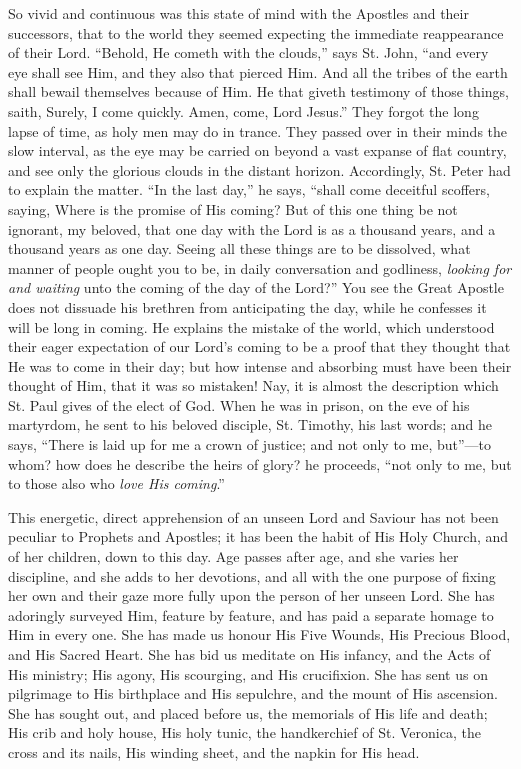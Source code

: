 So vivid and continuous was this state of mind with
the Apostles and their successors, that to the world they
seemed expecting the immediate reappearance of their
Lord. ``Behold, He cometh with the clouds,'' says
St. John, ``and every eye shall see Him, and they
also that pierced Him. And all the tribes of the earth
shall bewail themselves because of Him. He that giveth
testimony of those things, saith, Surely, I come quickly.
Amen, come, Lord Jesus.'' They forgot the long lapse
of time, as holy men may do in trance. They passed over
in their minds the slow interval, as the eye may be
carried on beyond a vast expanse of flat country, and see
only the glorious clouds in the distant horizon.
Accordingly, St. Peter had to explain the matter.
``In the last day,'' he says, ``shall come
deceitful scoffers, saying, Where is the promise of His
coming? But of this one thing be not ignorant, my
beloved, that one day with the Lord is as a thousand
years, and a thousand years as one day. Seeing all these
things are to be dissolved, what manner of people ought
you to be, in daily conversation and godliness, \emph{looking
for and waiting} unto the coming of the day of the
Lord?'' You see the Great Apostle does not dissuade
his brethren from anticipating the day, while he
confesses it will be long in coming. He explains the
mistake of the world, which understood their eager
expectation of our Lord's coming to be a proof that they
thought that He was to come in their day; but how intense
and absorbing must have been their thought of Him, that
it was so mistaken! Nay, it is almost the description
which St. Paul gives of the elect of God. When he was in
prison, on the eve of his martyrdom, he sent to his
beloved disciple, St. Timothy, his last words; and he
says, ``There is laid up for me a crown of justice;
and not only to me, but''—to whom? how does he
describe the heirs of glory? he proceeds, ``not only
to me, but to those also who \emph{love His coming}.''

This energetic, direct apprehension of an unseen Lord
and Saviour has not been peculiar to Prophets and
Apostles; it has been the habit of His Holy Church, and
of her children, down to this day. Age passes after age,
and she varies her discipline, and she adds to her
devotions, and all with the one purpose of fixing her own
and their gaze more fully upon the person of her unseen
Lord. She has adoringly surveyed Him, feature by feature,
and has paid a separate homage to Him in every one. She
has made us honour His Five Wounds, His Precious Blood,
and His Sacred Heart. She has bid us meditate on His
infancy, and the Acts of His ministry; His agony, His
scourging, and His crucifixion. She has sent us on
pilgrimage to His birthplace and His sepulchre, and the
mount of His ascension. She has sought out, and placed
before us, the memorials of His life and death; His crib
and holy house, His holy tunic, the handkerchief of St.
Veronica, the cross and its nails, His winding sheet, and
the napkin for His head.

